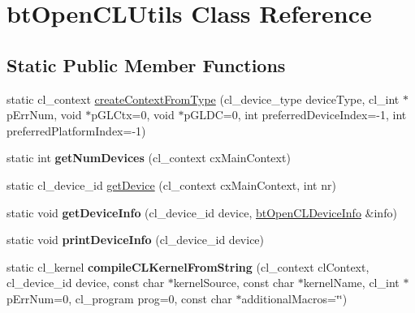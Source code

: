 \hypertarget{classbt_open_c_l_utils}{\section{bt\+Open\+C\+L\+Utils Class Reference}
\label{classbt_open_c_l_utils}
}
\subsection*{Static Public Member Functions}
\begin{DoxyCompactItemize}
\item 
static cl\+\_\+context \hyperlink{classbt_open_c_l_utils_a4b81a879150afd165f934e5c1505ad06}{create\+Context\+From\+Type} (cl\+\_\+device\+\_\+type device\+Type, cl\+\_\+int $\ast$p\+Err\+Num, void $\ast$p\+G\+L\+Ctx=0, void $\ast$p\+G\+L\+D\+C=0, int preferred\+Device\+Index=-\/1, int preferred\+Platform\+Index=-\/1)
\item 
\hypertarget{classbt_open_c_l_utils_a21290d800a40f90be5923417859376aa}{static int {\bfseries get\+Num\+Devices} (cl\+\_\+context cx\+Main\+Context)}\label{classbt_open_c_l_utils_a21290d800a40f90be5923417859376aa}

\item 
static cl\+\_\+device\+\_\+id \hyperlink{classbt_open_c_l_utils_a13d31c584622e8e8f898548f2a1e98e3}{get\+Device} (cl\+\_\+context cx\+Main\+Context, int nr)
\item 
\hypertarget{classbt_open_c_l_utils_a774679901ebccea1d3ab56b2543a8a85}{static void {\bfseries get\+Device\+Info} (cl\+\_\+device\+\_\+id device, \hyperlink{structbt_open_c_l_device_info}{bt\+Open\+C\+L\+Device\+Info} \&info)}\label{classbt_open_c_l_utils_a774679901ebccea1d3ab56b2543a8a85}

\item 
\hypertarget{classbt_open_c_l_utils_aa60c07774129e5550858709af0f8ed29}{static void {\bfseries print\+Device\+Info} (cl\+\_\+device\+\_\+id device)}\label{classbt_open_c_l_utils_aa60c07774129e5550858709af0f8ed29}

\item 
\hypertarget{classbt_open_c_l_utils_a8e265c83dc93b1407a66a07caa7d0116}{static cl\+\_\+kernel {\bfseries compile\+C\+L\+Kernel\+From\+String} (cl\+\_\+context cl\+Context, cl\+\_\+device\+\_\+id device, const char $\ast$kernel\+Source, const char $\ast$kernel\+Name, cl\+\_\+int $\ast$p\+Err\+Num=0, cl\+\_\+program prog=0, const char $\ast$additional\+Macros=\char`\"{}\char`\"{})}\label{classbt_open_c_l_utils_a8e265c83dc93b1407a66a07caa7d0116}


\end{DoxyCompactItemize}
